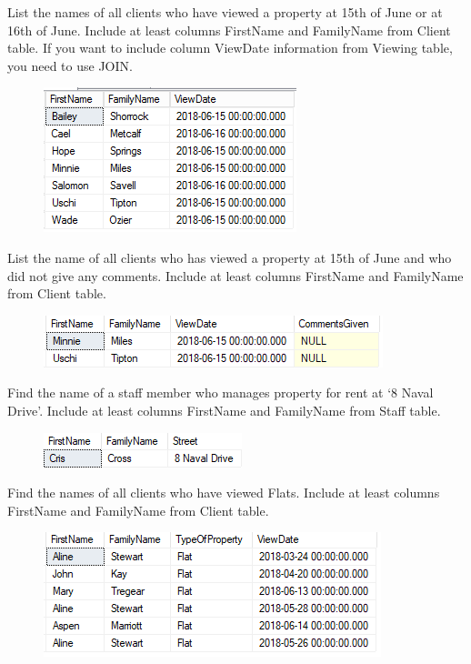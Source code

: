 \documentclass[12pt,a4paper]{article}
\begin{document}
List the names of all clients who have viewed a property at 15th of June or
at 16th of June. Include at least columns FirstName and FamilyName from
Client table. If you want to include column ViewDate information from Viewing
table, you need to use JOIN.
\begin{figure}[hbtp]
	\includegraphics[scale=1]{5-2viewdate.PNG}
	\end{figure}
List the name of all clients who has viewed a property at 15th of June and
who did not give any comments. Include at least columns FirstName and
FamilyName from Client table.
\begin{figure}[hbtp]
	\includegraphics[scale=1]{6-null-comment.PNG}
	\end{figure}
Find the name of a staff member who manages property for rent at ‘8
Naval Drive’. Include at least columns FirstName and FamilyName from Staff
table.
\begin{figure}[hbtp]
	\includegraphics[scale=1]{7-staff-street.PNG}
	\end{figure}
Find the names of all clients who have viewed Flats. Include at least
columns FirstName and FamilyName from Client table. 
\begin{figure}[hbtp]
	\includegraphics[scale=1]{8-view-flat.PNG}
	\end{figure}
\end{document}
